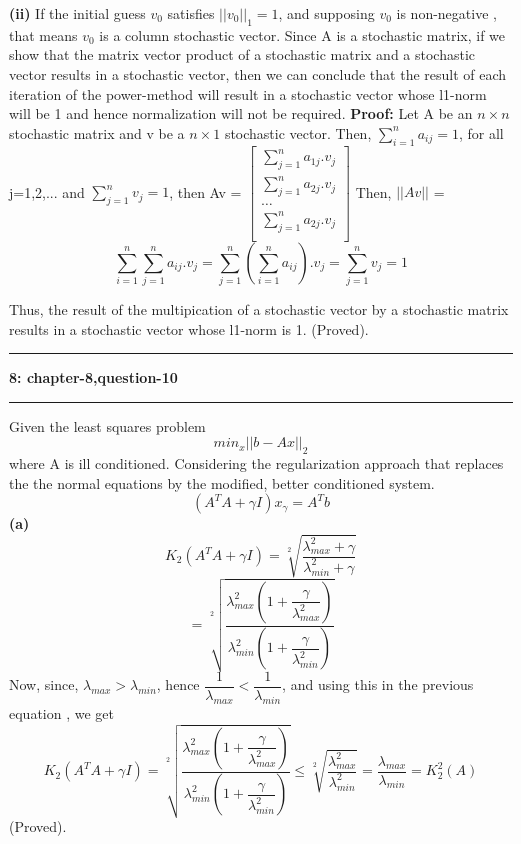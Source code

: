 \documentclass{article}
\newcommand\question[2]{\vspace{.25in}\hrule\textbf{#1: #2}\hrule\vspace{.10in}}
\renewcommand\part[1]{\vspace{.10in}\textbf{(#1)}}
\begin{document}
 \textbf {(ii)} If the initial guess $v_0$ satisfies $||v_0||_1 = 1$, and supposing $v_0$ is non-negative , that means $v_0$ is a column stochastic vector. Since A is a stochastic matrix, if we show that the matrix vector product of a stochastic matrix and a stochastic vector results in a stochastic vector, then we can conclude that the result of each iteration of the power-method will result in a stochastic vector whose l1-norm will be 1 and hence normalization will not be required. \newline
 \textbf {Proof:} Let A be an $n \times n$ stochastic matrix and v be a $n \times 1$ stochastic vector. \newline
 Then, $\sum_{i=1}^n a_{ij} = 1$, for all j=1,2,... and $\sum_{j=1}^n v_{j} = 1$, then \newline
 Av = $\begin{bmatrix}
	 \sum_{j=1}^n a_{1j}.v_j \\
	 \sum_{j=1}^n a_{2j}.v_j \\
	 \dots \\
	 \sum_{j=1}^n a_{2j}.v_j \\
 \end{bmatrix}$
 Then, $||Av||$ = \[\sum_{i=1}^n \sum_{j=1}^n a_{ij}.v_j = \sum_{j=1}^n (\sum_{i=1}^n a_{ij}).v_j = \sum_{j=1}^n v_j = 1\]

 Thus, the result of the multipication of a stochastic vector by a stochastic matrix results in a stochastic vector whose l1-norm is 1. (Proved). \newline

 \question{8}{chapter-8,question-10}
 Given the least squares problem
 \[  min_x ||b - Ax||_2\]
 where A is ill conditioned. Considering the regularization approach that replaces the the normal equations by the modified, better conditioned system.
 \begin{equation}
 (A^TA + \gamma I)x_{\gamma} = A^Tb
 \end{equation}
 \part{a} 
 \[K_2(A^TA + \gamma I) = \sqrt[2]{\dfrac{\lambda_{max}^2 + \gamma}{\lambda_{min}^2 + \gamma}} \]
 \[ = \sqrt[2]{\dfrac{\lambda_{max}^2(1 + \dfrac{\gamma}{\lambda_{max}^2})}{\lambda_{min}^2(1 + \dfrac{\gamma}{\lambda_{min}^2})}}\]
 Now, since, $\lambda_{max} > \lambda_{min}$, hence $\dfrac{1}{\lambda_{max}} < \dfrac{1}{\lambda_{min}}$, and using this in the previous equation , we get
 \[K_2(A^TA + \gamma I) = \sqrt[2]{\dfrac{\lambda_{max}^2(1 + \dfrac{\gamma}{\lambda_{max}^2})}{\lambda_{min}^2(1 + \dfrac{\gamma}{\lambda_{min}^2})}} \leq \sqrt[2]{\dfrac{\lambda_{max}^2}{\lambda_{min}^2}} =  \dfrac{\lambda_{max}}{\lambda_{min}} = K_2^2(A)\]
 (Proved). \newline
\end{document}
